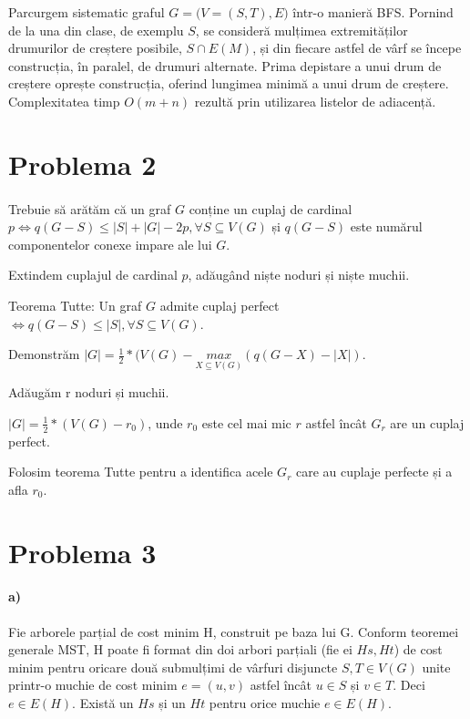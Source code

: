 \documentclass[paper=a4, fontsize=12pt]{scrartcl}
\begin{document}
Parcurgem sistematic graful $G = (V$$=$$(S,T), E)$ într-o manieră BFS. Pornind de la una din clase, de exemplu $S$, se consideră mulțimea extremităților
drumurilor de creștere posibile, $S \cap E(M)$, și din fiecare astfel de vârf se începe construcția, în paralel, de drumuri alternate. Prima depistare a unui
drum de creștere oprește construcția, oferind lungimea minimă a unui drum de creștere. Complexitatea timp $O(m+n)$ rezultă prin utilizarea listelor de adiacență.

\section*{Problema 2}
\paragraph{}
Trebuie să arătăm că un graf $G$ conține un cuplaj de cardinal $p \Leftrightarrow q(G-S) \leq |S| + |G| - 2p, \forall S \subseteq V(G)$ și $q(G-S)$ este numărul componentelor 
conexe impare ale lui $G$.

Extindem cuplajul de cardinal $p$, adăugând niște noduri și niște muchii.

Teorema Tutte: Un graf $G$ admite cuplaj perfect $\Leftrightarrow q(G-S) \leq |S|, \forall S \subseteq V(G)$.

Demonstrăm $|G| = \frac{1}{2} \ast (V(G) - \underset{X \subseteq V(G)}{max} (q(G-X) - |X|)$.

Adăugăm r noduri și muchii.

$|G| = \frac{1}{2} \ast (V(G) - r_0)$, unde $r_0$ este cel mai mic $r$ astfel încât $G_r$ are un cuplaj perfect.

Folosim teorema Tutte pentru a identifica acele $G_r$ care au cuplaje perfecte și a afla $r_0$.

   
\section*{Problema 3}
\paragraph{a)}
Fie arborele parțial de cost minim H, construit pe baza lui G. Conform teoremei generale MST, H poate fi format din doi arbori parțiali
(fie ei $Hs, Ht$) de cost minim pentru oricare două submulțimi de vârfuri disjuncte $S,T \in V(G)$ unite printr-o muchie de cost minim $e=(u,v)$
astfel încât $u \in S$ și $v \in T$. Deci $e \in E(H)$. Există un $Hs$ și un $Ht$ pentru orice muchie $e \in E(H)$.
\end{document}
